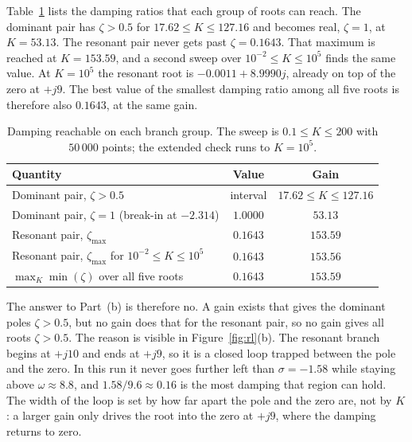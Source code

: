 \documentclass[12pt,a4paper]{article}
\begin{document}
Table~\ref{tab:zeta} lists the damping ratios that each group of roots can reach.
The dominant pair has \(\zeta>0.5\) for \(17.62\le K\le 127.16\) and becomes real, \(\zeta=1\), at \(K=53.13\).
The resonant pair never gets past \(\zeta=0.1643\).
That maximum is reached at \(K=153.59\), and a second sweep over \(10^{-2}\le K\le 10^{5}\) finds the same value.
At \(K=10^5\) the resonant root is \(-0.0011+8.9990j\), already on top of the zero at \(+j9\).
The best value of the smallest damping ratio among all five roots is therefore also \(0.1643\), at the same gain.

\begin{table}[H]
  \centering
  \caption{Damping reachable on each branch group. The sweep is \(0.1\le K\le 200\) with \(50\,000\) points; the extended check runs to \(K=10^5\).}
  \label{tab:zeta}
  \begin{tabular}{lcc}
    \toprule
    Quantity & Value & Gain \\
    \midrule
    Dominant pair, \(\zeta>0.5\) & interval & \(17.62\le K\le 127.16\) \\
    Dominant pair, \(\zeta=1\) (break-in at \(-2.314\)) & \(1.0000\) & \(53.13\) \\
    Resonant pair, \(\zeta_{\max}\) & \(0.1643\) & \(153.59\) \\
    Resonant pair, \(\zeta_{\max}\) for \(10^{-2}\le K\le 10^{5}\) & \(0.1643\) & \(153.56\) \\
    \(\max_K\min(\zeta)\) over all five roots & \(0.1643\) & \(153.59\) \\
    \bottomrule
  \end{tabular}
\end{table}

The answer to Part~(b) is therefore no.
A gain exists that gives the dominant poles \(\zeta>0.5\), but no gain does that for the resonant pair, so no gain gives all roots \(\zeta>0.5\).
The reason is visible in Figure~\ref{fig:rl}(b).
The resonant branch begins at \(+j10\) and ends at \(+j9\), so it is a closed loop trapped between the pole and the zero.
In this run it never goes further left than \(\sigma=-1.58\) while staying above \(\omega\approx 8.8\), and \(1.58/9.6\approx 0.16\) is the most damping that region can hold.
The width of the loop is set by how far apart the pole and the zero are, not by \(K\): a larger gain only drives the root into the zero at \(+j9\), where the damping returns to zero.

\end{document}

